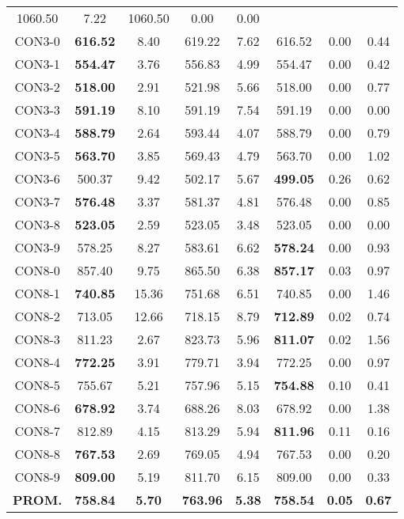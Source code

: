 \begin{table}[h]
\begin{tabular}{c c c c c c c c}
1060.50 & 7.22 & 1060.50 & 0.00
 & 0.00\\
CON3-0 & \bf{616.52} & 8.40 & 
619.22 & 7.62 & 616.52 & 0.00
 & 0.44\\CON3-1 & \bf{554.47} & 3.76 & 
556.83 & 4.99 & 554.47 & 0.00
 & 0.42\\CON3-2 & \bf{518.00} & 2.91 & 
521.98 & 5.66 & 518.00 & 0.00
 & 0.77\\CON3-3 & \bf{591.19} & 8.10 & 
591.19 & 7.54 & 591.19 & 0.00
 & 0.00\\
CON3-4 & \bf{588.79} & 2.64 & 
593.44 & 4.07 & 588.79 & 0.00
 & 0.79\\CON3-5 & \bf{563.70} & 3.85 & 
569.43 & 4.79 & 563.70 & 0.00
 & 1.02\\CON3-6 & 500.37 & 9.42 & 
502.17 & 5.67 & \bf{499.05} & 
0.26 & 0.62\\CON3-7 & \bf{576.48} & 3.37 & 
581.37 & 4.81 & 576.48 & 0.00
 & 0.85\\CON3-8 & \bf{523.05} & 2.59 & 
523.05 & 3.48 & 523.05 & 0.00
 & 0.00\\
CON3-9 & 578.25 & 8.27 & 
583.61 & 6.62 & \bf{578.24} & 
0.00 & 0.93\\CON8-0 & 857.40 & 9.75 & 
865.50 & 6.38 & \bf{857.17} & 
0.03 & 0.97\\CON8-1 & \bf{740.85} & 15.36 & 
751.68 & 6.51 & 740.85 & 0.00
 & 1.46\\CON8-2 & 713.05 & 12.66 & 
718.15 & 8.79 & \bf{712.89} & 
0.02 & 0.74\\CON8-3 & 811.23 & 2.67 & 
823.73 & 5.96 & \bf{811.07} & 
0.02 & 1.56\\CON8-4 & \bf{772.25} & 3.91 & 
779.71 & 3.94 & 772.25 & 0.00
 & 0.97\\CON8-5 & 755.67 & 5.21 & 
757.96 & 5.15 & \bf{754.88} & 
0.10 & 0.41\\CON8-6 & \bf{678.92} & 3.74 & 
688.26 & 8.03 & 678.92 & 0.00
 & 1.38\\CON8-7 & 812.89 & 4.15 & 
813.29 & 5.94 & \bf{811.96} & 
0.11 & 0.16\\CON8-8 & \bf{767.53} & 2.69 & 
769.05 & 4.94 & 767.53 & 0.00
 & 0.20\\CON8-9 & \bf{809.00} & 5.19 & 
811.70 & 6.15 & 809.00 & 0.00
 & 0.33\\\bf{PROM.} & 
\bf{758.84} & \bf{5.70} & \bf{763.96} & \bf{5.38} & \bf{758.54} & \bf{0.05} & \bf{0.67}\\[1ex]\hline
\end{tabular}
\label{table:nonlin}
\end{table}
